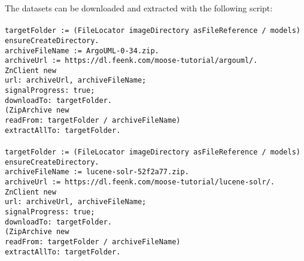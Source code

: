 \documentclass [11pt, a4wide, twoside]{article}
\begin{document}
\noindent The datasets can be downloaded and extracted with the following script:\\\\
\texttt{targetFolder := (FileLocator imageDirectory asFileReference / \textquotesingle models\textquotesingle) ensureCreateDirectory.\\
archiveFileName := \textquotesingle ArgoUML-0-34.zip\textquotesingle.\\
archiveUrl := \textquotesingle https://dl.feenk.com/moose-tutorial/argouml/\textquotesingle.\\
ZnClient new\\
\hspace*{0.5cm}url: archiveUrl, archiveFileName;\\
\hspace*{0.5cm}signalProgress: true;\\
\hspace*{0.5cm}downloadTo: targetFolder.\\
(ZipArchive new\\
\hspace*{0.5cm}readFrom: targetFolder / archiveFileName)\\
\hspace*{0.5cm}extractAllTo: targetFolder.}\\\\
\texttt{targetFolder := (FileLocator imageDirectory asFileReference / \textquotesingle models\textquotesingle) ensureCreateDirectory.\\
archiveFileName := \textquotesingle lucene-solr-52f2a77.zip\textquotesingle.\\
archiveUrl := \textquotesingle https://dl.feenk.com/moose-tutorial/lucene-solr/\textquotesingle.\\
ZnClient new\\
\hspace*{0.5cm}url: archiveUrl, archiveFileName;\\
\hspace*{0.5cm}signalProgress: true;\\
\hspace*{0.5cm}downloadTo: targetFolder.\\
(ZipArchive new\\
\hspace*{0.5cm}readFrom: targetFolder / archiveFileName)\\
\hspace*{0.5cm}extractAllTo: targetFolder.}\\
\end{document}

